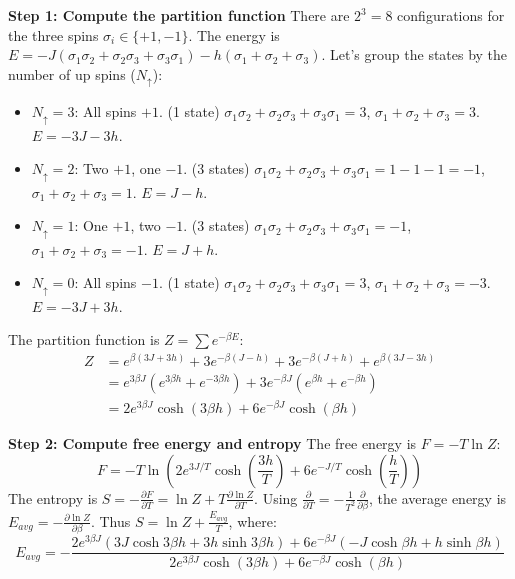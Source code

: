 \begin{solution}
\textbf{Step 1: Compute the partition function}
There are $2^3 = 8$ configurations for the three spins $\sigma_i \in \{+1, -1\}$.
The energy is $E = -J(\sigma_1\sigma_2 + \sigma_2\sigma_3 + \sigma_3\sigma_1) - h(\sigma_1+\sigma_2+\sigma_3)$. Let's group the states by the number of up spins ($N_\uparrow$):
\begin{itemize}
    \item $N_\uparrow = 3$: All spins $+1$. (1 state)
    $\sigma_1\sigma_2 + \sigma_2\sigma_3 + \sigma_3\sigma_1 = 3$, $\sigma_1+\sigma_2+\sigma_3 = 3$.
    $E = -3J - 3h$.
    \item $N_\uparrow = 2$: Two $+1$, one $-1$. (3 states)
    $\sigma_1\sigma_2 + \sigma_2\sigma_3 + \sigma_3\sigma_1 = 1 - 1 - 1 = -1$, $\sigma_1+\sigma_2+\sigma_3 = 1$.
    $E = J - h$.
    \item $N_\uparrow = 1$: One $+1$, two $-1$. (3 states)
    $\sigma_1\sigma_2 + \sigma_2\sigma_3 + \sigma_3\sigma_1 = -1$, $\sigma_1+\sigma_2+\sigma_3 = -1$.
    $E = J + h$.
    \item $N_\uparrow = 0$: All spins $-1$. (1 state)
    $\sigma_1\sigma_2 + \sigma_2\sigma_3 + \sigma_3\sigma_1 = 3$, $\sigma_1+\sigma_2+\sigma_3 = -3$.
    $E = -3J + 3h$.
\end{itemize}
The partition function is $Z = \sum e^{-\beta E}$:
\[ \begin{aligned}
    Z &= e^{\beta(3J + 3h)} + 3e^{-\beta(J - h)} + 3e^{-\beta(J + h)} + e^{\beta(3J - 3h)} \\
      &= e^{3\beta J} (e^{3\beta h} + e^{-3\beta h}) + 3e^{-\beta J} (e^{\beta h} + e^{-\beta h}) \\
      &= 2e^{3\beta J} \cosh(3\beta h) + 6e^{-\beta J} \cosh(\beta h)
\end{aligned} \]

\textbf{Step 2: Compute free energy and entropy}
The free energy is $F = -T \ln Z$:
\[ F = -T \ln\left( 2e^{3J/T} \cosh\left(\frac{3h}{T}\right) + 6e^{-J/T} \cosh\left(\frac{h}{T}\right) \right) \]
The entropy is $S = -\frac{\partial F}{\partial T} = \ln Z + T \frac{\partial \ln Z}{\partial T}$.
Using $\frac{\partial}{\partial T} = -\frac{1}{T^2} \frac{\partial}{\partial \beta}$, the average energy is $E_{avg} = -\frac{\partial \ln Z}{\partial \beta}$. Thus $S = \ln Z + \frac{E_{avg}}{T}$, where:
\[ E_{avg} = - \frac{ 2e^{3\beta J} (3J\cosh 3\beta h + 3h\sinh 3\beta h) + 6e^{-\beta J} (-J\cosh \beta h + h\sinh \beta h) }{ 2e^{3\beta J} \cosh(3\beta h) + 6e^{-\beta J} \cosh(\beta h) } \]


\end{solution}
